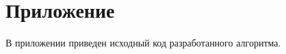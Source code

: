 \documentclass[12pt, a4paper]{article}
\begin{document}
	\section*{Приложение}
	В приложении приведен исходный код разработанного алгоритма.
%
%
%
%
%
%
%
%
%
%
%
%
%
%
%
%
%
%
%
%

  
\end{document}
